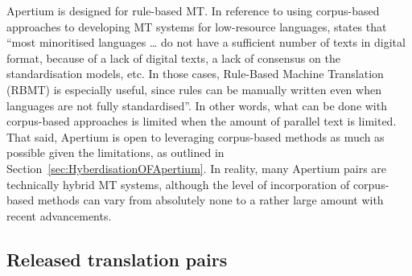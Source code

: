 \documentclass[free]{flammie}
\begin{document}
Apertium is designed for rule-based MT.  In reference to using corpus-based
approaches to developing MT systems for low-resource languages,
\cite{martín-mor2017technologies} states that ``most minoritised languages \dots{} do not
have a sufficient number of texts in digital format, because of a lack of
digital texts, a lack of consensus on the standardisation models, etc. In those
cases, Rule-Based Machine Translation (RBMT) is especially useful, since rules
can be manually written even when languages are not fully standardised''.   In
other words, what can be done with corpus-based approaches is limited when the
amount of parallel text is limited.  That said, Apertium is open to leveraging
corpus-based methods as much as possible given the limitations, as outlined in
Section~\ref{sec:HyberdisationOFApertium}.  In reality, many Apertium pairs are
technically hybrid MT systems, although the level of incorporation of
corpus-based methods can vary from absolutely none to a rather large amount with
recent advancements.

\subsection{Released translation pairs}\label{sec:ReleasedLan}

\begin{table*}[t]
\centering
\caption{Released translation systems per language family and sub-family.}
\label{tab:Lang}
\end{table*}
\end{document}
